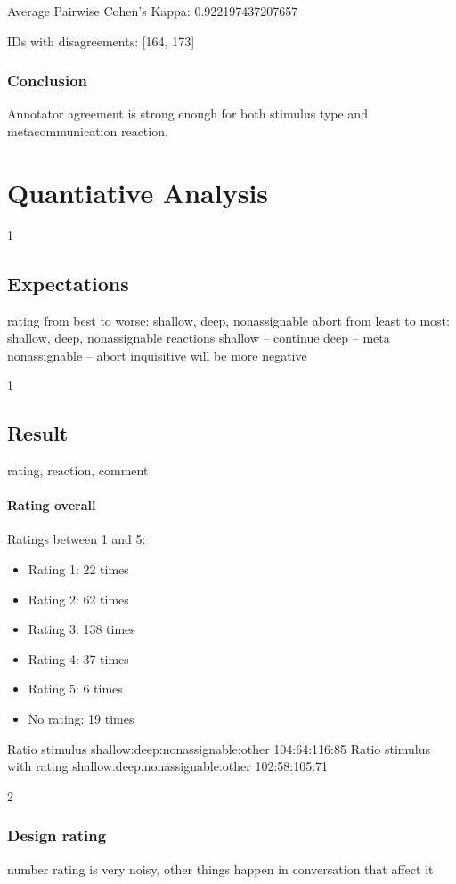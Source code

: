         Average Pairwise Cohen's Kappa: 0.922197437207657

        IDs with disagreements:
        [164, 173]

\subsubsection{Conclusion}
        Annotator agreement is strong enough for both stimulus type and metacommunication reaction.




\section{Quantiative Analysis}


1
\subsection{Expectations}
rating
from best to worse: shallow, deep, nonassignable
abort
from least to most: shallow, deep, nonassignable
reactions
shallow 	– continue
deep		– meta
nonassignable 	– abort
inquisitive will be more negative

1
\subsection{Result}

rating, reaction, comment

\paragraph{Rating overall}
Ratings between 1 and 5:

\begin{itemize}
\item Rating 1: 22 times
\item Rating 2: 62 times
\item Rating 3: 138 times
\item Rating 4: 37 times
\item Rating 5: 6 times
\item No rating: 19 times
\end{itemize}
Ratio stimulus shallow:deep:nonassignable:other 104:64:116:85
Ratio stimulus with rating shallow:deep:nonassignable:other 102:58:105:71

2
\subsubsection{Design rating}
number rating is very noisy, other things happen in conversation that affect it

